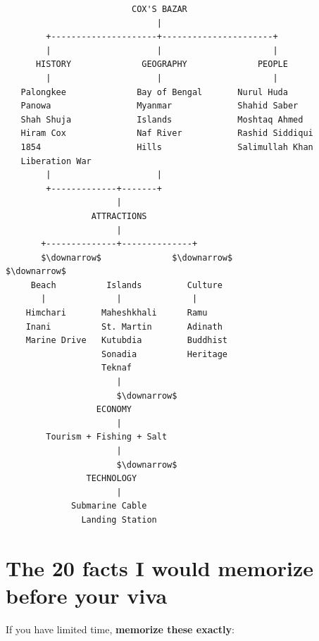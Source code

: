 \begin{lstlisting}
                         COX'S BAZAR
                              |
        +---------------------+----------------------+
        |                     |                      |
      HISTORY              GEOGRAPHY              PEOPLE
        |                     |                      |
   Palongkee              Bay of Bengal       Nurul Huda
   Panowa                 Myanmar             Shahid Saber
   Shah Shuja             Islands             Moshtaq Ahmed
   Hiram Cox              Naf River           Rashid Siddiqui
   1854                   Hills               Salimullah Khan
   Liberation War
        |                     |
        +-------------+-------+
                      |
                 ATTRACTIONS
                      |
       +--------------+--------------+
       $\downarrow$              $\downarrow$              $\downarrow$
     Beach          Islands         Culture
       |              |              |
    Himchari       Maheshkhali      Ramu
    Inani          St. Martin       Adinath
    Marine Drive   Kutubdia         Buddhist
                   Sonadia          Heritage
                   Teknaf
                      |
                      $\downarrow$
                  ECONOMY
                      |
        Tourism + Fishing + Salt
                      |
                      $\downarrow$
                TECHNOLOGY
                      |
             Submarine Cable
               Landing Station
\end{lstlisting}

\medskip

\section{The 20 facts I would memorize before your viva}

If you have limited time, \textbf{memorize these exactly}:

